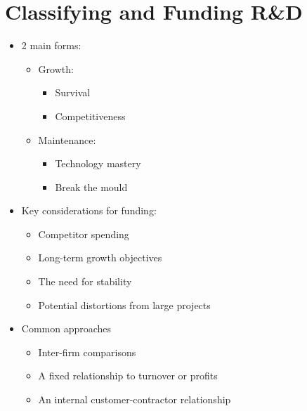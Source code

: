 \documentclass[openany,12pt,a4paper]{book}
\begin{document}
\section{Classifying and Funding R\&D}
\begin{itemize}
    \item 2 main forms:
    \begin{itemize}
        \item Growth:
        \begin{itemize}
            \item Survival
            \item Competitiveness
        \end{itemize}
        \item Maintenance:
        \begin{itemize}
            \item Technology mastery
            \item Break the mould
        \end{itemize}
    \end{itemize}
    \item Key considerations for funding:
    \begin{itemize}
        \item Competitor spending
        \item Long-term growth objectives
        \item The need for stability
        \item Potential distortions from large projects
    \end{itemize}
    \item Common approaches
    \begin{itemize}
        \item Inter-firm comparisons
        \item A fixed relationship to turnover or profits
        \item An internal customer-contractor relationship
    \end{itemize}
\end{itemize}
\end{document}
